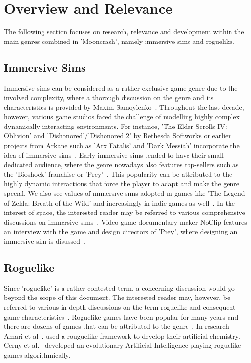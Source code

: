 \documentclass[a4paper]{article}
\begin{document}
\section{Overview and Relevance}
The following section focuses on research, relevance and development within the main genres combined in 'Mooncrash', namely immersive sims and roguelike.

\subsection{Immersive Sims}
Immersive sims can be considered as a rather exclusive game genre due to the involved complexity, where a thorough discussion on the genre and its characteristics is provided by Maxim Samoylenko~\cite{samoylenko}. Throughout the last decade, however, various game studios faced the challenge of modelling highly complex dynamically interacting environments. For instance, 'The Elder Scrolls IV: Oblivion' and 'Dishonored'/'Dishonored 2' by Bethesda Softworks or earlier projects from Arkane such as 'Arx Fatalis' and 'Dark Messiah' incorporate the idea of immersive sims~\cite{lane}. Early immersive sims tended to have their small dedicated audience, where the genre nowadays also features top-sellers such as the 'Bioshock' franchise or 'Prey'~\cite{baker}. This popularity can be attributed to the highly dynamic interactions that force the player to adapt and make the genre special. We also see values of immersive sims adopted in games like 'The Legend of Zelda: Breath of the Wild' and increasingly in indie games as well~\cite{mckeand}. In the interest of space, the interested reader may be referred to various comprehensive discussions on immersive sims~\cite{moss, lane:2019, immersive_sim, gomes}. Video game documentary maker NoClip features an interview with the game and design directors of 'Prey', where designing an immersive sim is disussed~\cite{kerr}.\newline

\subsection{Roguelike} 
Since 'roguelike' is a rather contested term, a concerning discussion would go beyond the scope of this document. The interested reader may, however, be referred to various in-depth discussions on the term roguelike and consequent game characteristics~\cite{zapata, McHugh, harris}. Roguelike games have been popular for many years and there are dozens of games that can be attributed to the genre~\cite{roguelike, coles}. In research, Amari et al~\cite{amari}. used a rouguelike framework to develop their artificial chemistry. Cerny et al.~\cite{cerny} developed an evolutionary Artificial Intelligence playing roguelike games algorithmically.
\end{document}
